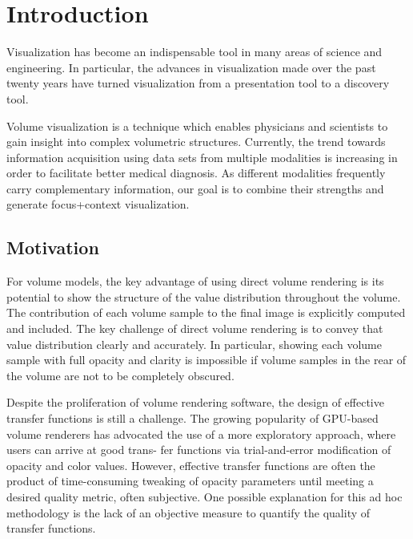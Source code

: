
\chapter{Introduction}\label{chap:intro}

Visualization has become an indispensable tool in many areas of science and engineering. In particular, the advances in visualization made over the past twenty years have turned visualization from a presentation tool to a discovery tool.

Volume visualization is a technique which enables physicians and scientists to gain insight into complex volumetric structures. Currently, the trend towards information acquisition using data sets from multiple modalities is increasing in order to facilitate better medical diagnosis. As different modalities frequently carry complementary information, our goal is to combine their strengths and generate focus+context  visualization.


\section{Motivation}



For volume models, the key advantage of using direct volume rendering is its potential to show the structure of the value distribution throughout the volume. The contribution of each volume sample to the final image is explicitly computed and included. The key challenge of direct volume rendering is to convey that value distribution clearly and accurately. In particular, showing each volume sample with full opacity and clarity is impossible if volume samples in the rear of the volume are not to be completely obscured.

Despite the proliferation of volume rendering software, the design of effective transfer functions is still a challenge. The growing popularity of GPU-based volume renderers has advocated the use of a more exploratory approach, where users can arrive at good trans-
fer functions via trial-and-error modification of opacity and color values. However, effective transfer functions are often the product
of time-consuming tweaking of opacity parameters until meeting a desired quality metric, often subjective. One possible explanation
for this ad hoc methodology is the lack of an objective measure to quantify the quality of transfer functions. 


